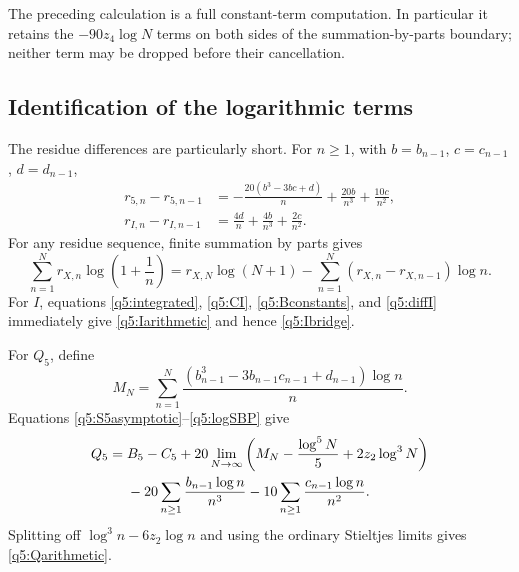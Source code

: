 The preceding calculation is a full constant-term computation.  In
particular it retains the $-90z_4\log N$ terms on both sides of
the summation-by-parts boundary; neither term may be dropped before
their cancellation.

\subsection{Identification of the logarithmic terms}

The residue differences are particularly short.  For $n\geq1$,
with $b=b_{n-1}$, $c=c_{n-1}$, $d=d_{n-1}$,
\begin{align}
 r_{5,n}-r_{5,n-1}
    &=-\frac{20(b^3-3bc+d)}n+\frac{20b}{n^3}
                              +\frac{10c}{n^2},
      \label{q5:diff5}\\
 r_{I,n}-r_{I,n-1}
    &=\frac{4d}n+\frac{4b}{n^3}+\frac{2c}{n^2}.
      \label{q5:diffI}
\end{align}
For any residue sequence, finite summation by parts gives
\begin{equation}\label{q5:logSBP}
 \sum_{n=1}^Nr_{X,n}\log\left(1+\frac1n\right)
  =r_{X,N}\log(N+1)
       -\sum_{n=1}^N(r_{X,n}-r_{X,n-1})\log n.
\end{equation}
For $I$, equations \eqref{q5:integrated}, \eqref{q5:CI},
\eqref{q5:Bconstants}, and \eqref{q5:diffI} immediately give
\eqref{q5:Iarithmetic} and hence \eqref{q5:Ibridge}.

For $Q_5$, define
\[
 M_N=\sum_{n=1}^N\frac{(b_{n-1}^3-3b_{n-1}c_{n-1}+d_{n-1})\log n}{n}.
\]
Equations \eqref{q5:S5asymptotic}--\eqref{q5:logSBP} give
\begin{align}\label{q5:limit}
 Q_5={}&B_5-C_5+
       20\lim_{N\to\infty}
          \left(M_N-\frac{\log^5N}{5}+2z_2\log^3N\right)\notag\\
 &-20\sum_{n\geq1}\frac{b_{n-1}\log n}{n^3}
       -10\sum_{n\geq1}\frac{c_{n-1}\log n}{n^2}.
\end{align}
Splitting off $\log^3n-6z_2\log n$ and using the ordinary
Stieltjes limits gives \eqref{q5:Qarithmetic}.

